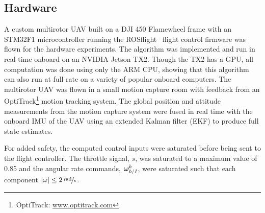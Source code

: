 
\subsection{Hardware}

A custom multirotor UAV built on a DJI 450 Flamewheel
frame with an STM32F1 microcontroller running the
ROSflight~\cite{jackson2016rosflight} flight control firmware was flown for the
hardware experiments. The algorithm was
implemented and run in real time onboard on an NVIDIA Jetson
TX2. Though the TX2 has a GPU, all computation was done using only the
ARM CPU, showing that this algorithm can also run at full rate on a variety
of popular onboard computers. The multirotor UAV was flown in a small motion capture room
with feedback from an OptiTrack\footnote{OptiTrack:
\url{www.optitrack.com}}
motion tracking system. The global position and attitude
measurements from the motion capture system were fused in real time with the
onboard IMU of the UAV using an extended Kalman filter (EKF) to produce
full state estimates. 

For added safety, the computed control inputs were saturated before being sent to
the flight controller. The throttle signal, $s$, was saturated to a maximum
value of 0.85 and the angular rate commands, $\boldsymbol{\mathrm{\omega}}_{b/I}^b$, were
saturated such that each component $\left\vert \omega\right\vert \leq 2\,
\nicefrac{\mathrm{rad}}{\mathrm{s}}$.

